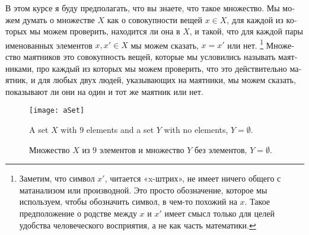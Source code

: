 \documentclass{book}
\theoremstyle{theoremENG}
\theoremstyle{lemmaENG}
\theoremstyle{propositionENG}
\theoremstyle{corollaryENG}
\theoremstyle{factENG}
\theoremstyle{remarkENG}
\theoremstyle{exampleENG}
\theoremstyle{warningENG}
\theoremstyle{questionENG}
\theoremstyle{guessENG}
\theoremstyle{answerENG}
\theoremstyle{constructionENG}
\theoremstyle{rulesENG}
\theoremstyle{excENG}
\theoremstyle{appENG}
\theoremstyle{definitionENG}
\theoremstyle{notationENG}
\theoremstyle{conjectureENG}
\theoremstyle{postulateENG}
\theoremstyle{theoremRUS}
\theoremstyle{lemmaRUS}
\theoremstyle{propositionRUS}
\theoremstyle{corollaryRUS}
\theoremstyle{factRUS}
\theoremstyle{remarkRUS}
\theoremstyle{exampleRUS}
\theoremstyle{warningRUS}
\theoremstyle{questionRUS}
\theoremstyle{guessRUS}
\theoremstyle{answerRUS}
\theoremstyle{constructionRUS}
\theoremstyle{rulesRUS}
\theoremstyle{excRUS}
\theoremstyle{appRUS}
\theoremstyle{definitionRUS}
\theoremstyle{notationRUS}
\theoremstyle{conjectureRUS}
\theoremstyle{postulateRUS}
\begin{document}
\begin{english}
\begin{russian}В этом курсе я буду предполагать, что вы знаете, что такое множество. Мы можем думать о множестве $X$ как о совокупности вещей $x\in X$, для каждой из которых мы можем проверить, находится ли она в $X$, и такой, что для каждой пары именованных элементов $x,x'\in X$ мы можем сказать, $x=x'$ или нет.
\footnote{Заметим, что символ $x'$, читается «x-штрих», не имеет ничего общего с матанализом или производной. Это просто обозначение, которое мы используем, чтобы обозначить символ, в чем-то похожий на $x$. Такое предположение о родстве между $x$ и $x'$ имеет смысл только для целей удобства человеческого восприятия, а не как часть математики.}
Множество маятников это совокупность вещей, которые мы условились называть маятниками, про каждый из которых мы можем проверить, что это действительно маятник, и для любых двух людей, указывающих на маятники, мы можем сказать, показывают ли они на один и тот же маятник или нет. \end{russian}

\begin{figure}
\begin{center}
\texttt{[image: aSet]}
\end{center}
\caption{A set $X$ with $9$ elements and a set $Y$ with no elements, $Y=\emptyset$.}
\begin{russian}\caption{Множество $X$ из $9$ элементов и множество $Y$ без элементов, $Y=\emptyset$.}\end{russian}
\end{figure}


\end{english}
\end{document}
